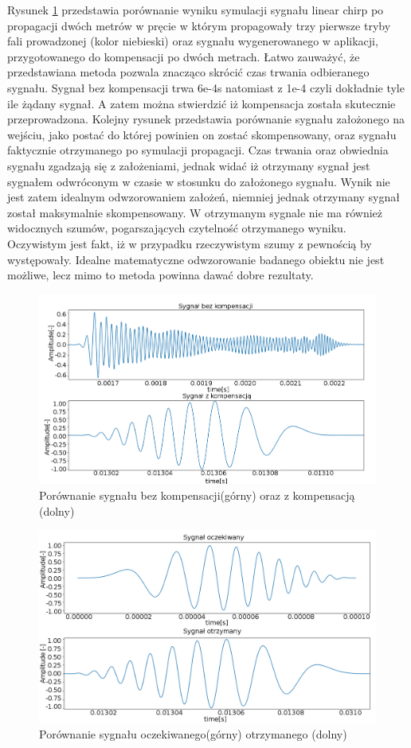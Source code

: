 Rysunek \ref{fig:porownanie} przedstawia porównanie wyniku symulacji sygnału linear chirp po propagacji dwóch metrów w pręcie w którym propagowały trzy pierwsze tryby fali prowadzonej (kolor niebieski) oraz sygnału wygenerowanego w aplikacji, przygotowanego do kompensacji po dwóch metrach. Łatwo zauważyć, że przedstawiana metoda pozwala znacząco skrócić czas trwania odbieranego sygnału. Sygnał bez kompensacji trwa 6e-4s natomiast z 1e-4 czyli dokładnie tyle ile żądany sygnał. A zatem można stwierdzić iż kompensacja została skutecznie przeprowadzona. Kolejny rysunek przedstawia porównanie sygnału założonego na wejściu, jako postać do której powinien on zostać skompensowany, oraz sygnału faktycznie otrzymanego po symulacji propagacji. Czas trwania oraz obwiednia sygnału zgadzają się z założeniami, jednak widać iż otrzymany sygnał jest sygnałem odwróconym w czasie w stosunku do założonego sygnału. Wynik nie jest zatem idealnym odwzorowaniem założeń, niemniej jednak otrzymany sygnał został maksymalnie skompensowany. W otrzymanym sygnale nie ma również widocznych szumów, pogarszających czytelność otrzymanego wyniku. Oczywistym jest fakt, iż w przypadku rzeczywistym szumy z pewnością by występowały. Idealne matematyczne odwzorowanie badanego obiektu nie jest możliwe, lecz mimo to metoda powinna dawać dobre rezultaty.

\begin{figure}[h]
\centering
\includegraphics[width=14cm]{Zdjecia/4/tr_porownanie}
\caption{Porównanie sygnału bez kompensacji(górny) oraz z kompensacją (dolny)}
\label{fig:porownanie}
\end{figure} 

\begin{figure}[h]
\centering
\includegraphics[width=14cm]{Zdjecia/4/tr_porownanie2}
\caption{Porównanie sygnału oczekiwanego(górny) otrzymanego (dolny)}
\label{fig:porownanie2}
\end{figure} 
